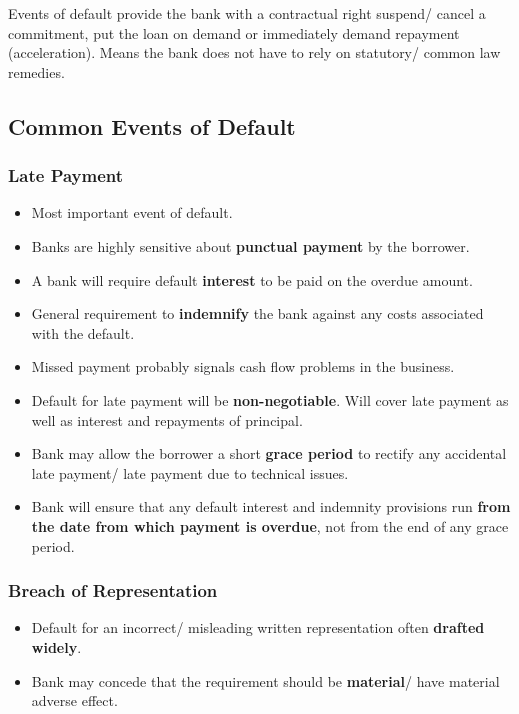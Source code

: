\documentclass[
]{article}
\providecommand{\tightlist}{%
  \setlength{\itemsep}{0pt}\setlength{\parskip}{0pt}}
\begin{document}
Events of default provide the bank with a contractual right suspend/
cancel a commitment, put the loan on demand or immediately demand
repayment (acceleration). Means the bank does not have to rely on
statutory/ common law remedies.

\hypertarget{common-events-of-default}{%
\subsection{Common Events of Default}\label{common-events-of-default}}

\hypertarget{late-payment}{%
\subsubsection{Late Payment}\label{late-payment}}

\begin{itemize}
\tightlist
\item
  Most important event of default.
\item
  Banks are highly sensitive about \textbf{punctual payment} by the
  borrower.
\item
  A bank will require default \textbf{interest} to be paid on the
  overdue amount.
\item
  General requirement to \textbf{indemnify} the bank against any costs
  associated with the default.
\item
  Missed payment probably signals cash flow problems in the business.
\item
  Default for late payment will be \textbf{non-negotiable}. Will cover
  late payment as well as interest and repayments of principal.
\item
  Bank may allow the borrower a short \textbf{grace period} to rectify
  any accidental late payment/ late payment due to technical issues.
\item
  Bank will ensure that any default interest and indemnity provisions
  run \textbf{from the date from which payment is overdue}, not from the
  end of any grace period.
\end{itemize}

\hypertarget{breach-of-representation}{%
\subsubsection{Breach of
Representation}\label{breach-of-representation}}

\begin{itemize}
\tightlist
\item
  Default for an incorrect/ misleading written representation often
  \textbf{drafted widely}.
\item
  Bank may concede that the requirement should be \textbf{material}/
  have material adverse effect.
\end{itemize}
\end{document}

